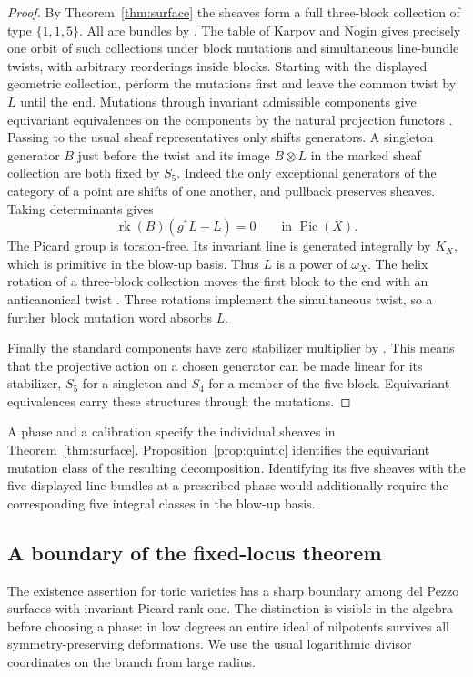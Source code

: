 \begin{proof}
By Theorem~\ref{thm:surface} the sheaves form a full three-block collection of type $\{1,1,5\}$. All are bundles by \cite[Corollary~3.4]{KN}. The table of Karpov and Nogin \cite[\S5.7, row (4)]{KN} gives precisely one orbit of such collections under block mutations and simultaneous line-bundle twists, with arbitrary reorderings inside blocks. Starting with the displayed geometric collection, perform the mutations first and leave the common twist by $L$ until the end. Mutations through invariant admissible components give equivariant equivalences on the components by the natural projection functors \cite[Remark~3.23 and Lemma~3.24]{ESS}. Passing to the usual sheaf representatives only shifts generators. A singleton generator $B$ just before the twist and its image $B\otimes L$ in the marked sheaf collection are both fixed by $S_5$. Indeed the only exceptional generators of the category of a point are shifts of one another, and pullback preserves sheaves. Taking determinants gives
\[
                 \operatorname{rk}(B)(g^*L-L)=0
                        \qquad\text{in }\operatorname{Pic}(X).
\]
The Picard group is torsion-free. Its invariant line is generated integrally by $K_X$, which is primitive in the blow-up basis. Thus $L$ is a power of $\omega_X$. The helix rotation of a three-block collection moves the first block to the end with an anticanonical twist \cite[\S5.6]{KN}. Three rotations implement the simultaneous twist, so a further block mutation word absorbs $L$.

Finally the standard components have zero stabilizer multiplier by \cite[Proposition~5.3]{ESS}. This means that the projective action on a chosen generator can be made linear for its stabilizer, $S_5$ for a singleton and $S_4$ for a member of the five-block. Equivariant equivalences carry these structures through the mutations.
\end{proof}

A phase and a calibration specify the individual sheaves in Theorem~\ref{thm:surface}. Proposition~\ref{prop:quintic} identifies the equivariant mutation class of the resulting decomposition. Identifying its five sheaves with the five displayed line bundles at a prescribed phase would additionally require the corresponding five integral classes in the blow-up basis.

\subsection{A boundary of the fixed-locus theorem}\label{sec:weyl}
The existence assertion for toric varieties has a sharp boundary among del Pezzo surfaces with invariant Picard rank one. The distinction is visible in the algebra before choosing a phase: in low degrees an entire ideal of nilpotents survives all symmetry-preserving deformations. We use the usual logarithmic divisor coordinates on the branch from large radius.

